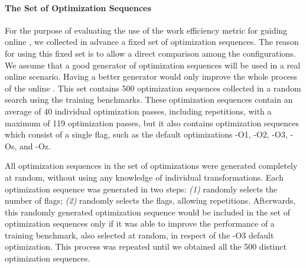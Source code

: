 \paragraph{The Set of Optimization Sequences}
For the purpose of evaluating the use of the work efficiency metric for guiding
online {\itercomp}, we collected in advance a fixed set of optimization sequences.
The reason for using this fixed set is to allow a direct comparison among the configurations.
We assume that a good generator of optimization sequences will be used in a real online scenario.
Having a better generator would only improve the whole process of the online {\itercomp}.
This set contains 500 optimization sequences collected in a random search using the training benchmarks.
These optimization sequences contain an average of 40 individual optimization passes,
including repetitions, with a maximum of 119 optimization passes, but it also contains
optimization sequences which consist of a single flag, such as the default optimizations
{\flagstype -O1}, {\flagstype -O2}, {\flagstype -O3}, {\flagstype -Os}, and {\flagstype -Oz}.

All optimization sequences in the set of optimizations were generated completely
at random, without using any knowledge of individual transformations.
Each optimization sequence was generated in two steps: \textit{(1)} randomly
selects the number of flags; \textit{(2)} randomly selects the flags, allowing repetitions.
Afterwards, this randomly generated optimization sequence would be included in
the set of optimization sequences only if it was able to improve the performance
of a training benchmark, also selected at random, in respect of the {\flagstype -O3}
default optimization.
This process was repeated until we obtained all the 500 distinct optimization sequences.

